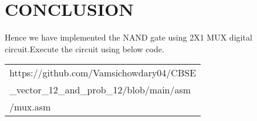 \documentclass[journal,12pt,twocolumn]{IEEEtran}
\begin{document}
\section{CONCLUSION}

Hence we have implemented the NAND gate using 2X1 MUX digital circuit.Execute the circuit using below code.
   \begin{tabularx}{0.46\textwidth} { 
  | >{\centering\arraybackslash}X |}
  \hline
https://github.com/Vamsichowdary04/CBSE\\\_vector\_12\_and\_prob\_12/blob/main/asm\\/mux.asm\\
  \hline
\end{tabularx}

\end{document}
